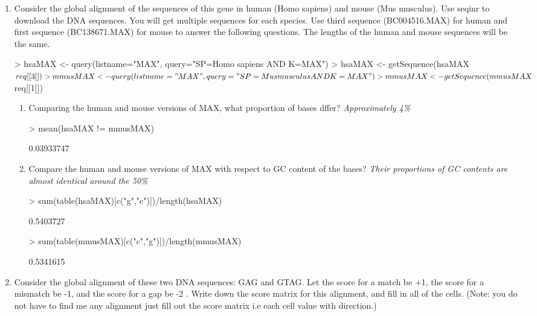 \documentclass[12pt,a4paper]{paper}
\begin{document}
\begin{enumerate}
\begin{enumerate}
\begin{enumerate}
\item Consider the global alignment of the sequences of this gene in human (Homo sapiens) and mouse (Mus musculus). Use seqinr to download the DNA sequences. You will get multiple sequences for each species. Use third sequence (BC004516.MAX) for human and first sequence (BC138671.MAX) for mouse to answer the following questions. The lengths of the human and mouse sequences will be the same.
\begin{Schunk}
\begin{Sinput}
> hsaMAX <- query(listname="MAX", query="SP=Homo sapiens AND K=MAX")
> hsaMAX <- getSequence(hsaMAX$req[[3]])
> mmusMAX <- query(listname="MAX", query="SP=Mus musculus AND K=MAX")
> mmusMAX <- getSequence(mmusMAX$req[[1]])
\end{Sinput}
\end{Schunk}
\begin{enumerate}
\item Comparing the human and mouse versions of MAX, what proportion of bases dffer? \textit{Approximately 4\%}
\begin{Schunk}
\begin{Sinput}
> mean(hsaMAX != mmusMAX)
\end{Sinput}
\begin{Soutput}
[1] 0.03933747
\end{Soutput}
\end{Schunk}
\item Compare the human and mouse versions of MAX with respect to GC content of the bases? \textit{Their proportions of GC contents are almost identical around the 50\%}
\begin{Schunk}
\begin{Sinput}
> sum(table(hsaMAX)[c("g","c")])/length(hsaMAX)
\end{Sinput}
\begin{Soutput}
[1] 0.5403727
\end{Soutput}
\begin{Sinput}
> sum(table(mmusMAX)[c("c","g")])/length(mmusMAX)
\end{Sinput}
\begin{Soutput}
[1] 0.5341615
\end{Soutput}
\end{Schunk}
\end{enumerate}
\item Consider the global alignment of these two DNA sequences: GAG and GTAG. Let the score for a match be +1, the score for a mismatch be -1, and the score for a gap be -2 . Write down the score matrix for this alignment, and fill in all of the cells. (Note: you do not have to find me any alignment just fill out the score matrix i.e each cell value with direction.)

\end{enumerate}
\end{enumerate}
\end{enumerate}
\end{document}

